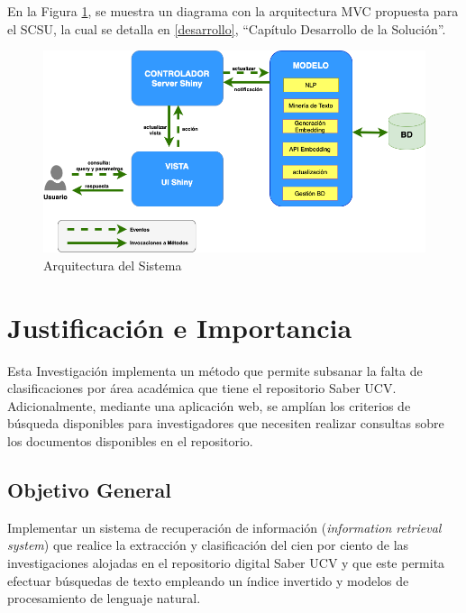 \documentclass[
  12pt,
  openany]{book}
\begin{document}
En la Figura \ref{fig:arquitecturasri}, se muestra un diagrama con la arquitectura MVC propuesta para el SCSU, la cual se detalla en \ref{desarrollo}, ``Capítulo Desarrollo de la Solución''.

\begin{figure}

{\centering \includegraphics[width=0.9\linewidth]{images/05-desarrollo/MVC9} 

}

\caption{Arquitectura del Sistema}\label{fig:arquitecturasri}
\end{figure}

\hypertarget{justificacion}{%
\section{Justificación e Importancia}\label{justificacion}}

Esta Investigación implementa un método que permite subsanar la falta de clasificaciones por área académica que tiene el repositorio Saber UCV. Adicionalmente, mediante una aplicación web, se amplían los criterios de búsqueda disponibles para investigadores que necesiten realizar consultas sobre los documentos disponibles en el repositorio.

\hypertarget{objegeneral}{%
\subsection{Objetivo General}\label{objegeneral}}

Implementar un sistema de recuperación de información (\emph{information retrieval system}) que realice la extracción y clasificación del cien por ciento de las investigaciones alojadas en el repositorio digital Saber UCV y que este permita efectuar búsquedas de texto empleando un índice invertido y modelos de procesamiento de lenguaje natural.
\end{document}

